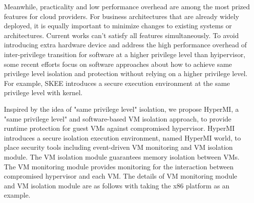 \documentclass[conference]{IEEEtran}
\begin{document}
Meanwhile, practicality and low performance overhead are among the most prized features for cloud providers. For business architectures that are already widely deployed, it is equally important to minimize changes to existing systems or architectures. Current works can't satisfy all features simultaneously. To avoid introducing extra hardware device and address the high performance overhead of inter-privilege transition for software at a higher privilege level than hyipervisor, some recent efforts focus on software approaches about how to achieve same privilege level isolation and protection without relying on a higher privilege level. For example, SKEE\cite{Azab2016SKEE} introduces a secure execution environment at the same privilege level with kernel. 


Inspired by the idea of "same privilege level" isolation, we propose HyperMI, a "same privilege level" and software-based VM isolation approach, to provide runtime protection for guest VMs against compromised hypervisor. HyperMI introduces a secure isolation execution environment, named HyperMI world, to place security tools including event-driven VM monitoring and VM isolation module. The VM isolation module guarantees memory isolation between VMs. The VM monitoring module provides monitoring for the interaction between compromised hypervisor and each VM. The details of VM monitoring module and VM isolation module are as follows with taking the x86 platform as an example.

\end{document}
